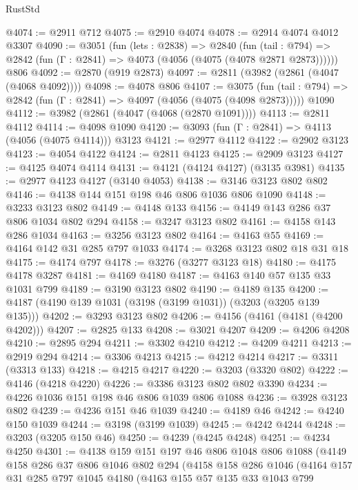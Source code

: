 \begin{lexlean}{RustStd}
\begin{coremodule}
@4074 := @2911 @712
@4075 := @2910 @4074
@4078 := @2914 @4074 @4012 @3307
@4090 := @3051
    (fun (lets : @2838) =>
    @2840
      (fun (tail : @794) => @2842 (fun (Γ : @2841) => @4073 (@4056 (@4075 (@4078 @2871 @2873))))))
    @806
@4092 := @2870 (@919 @2873)
@4097 := @2811 (@3982 (@2861 (@4047 (@4068 @4092))))
@4098 := @4078 @806
@4107 := @3075
    (fun (tail : @794) => @2842 (fun (Γ : @2841) => @4097 (@4056 (@4075 (@4098 @2873)))))
    @1090
@4112 := @3982 (@2861 (@4047 (@4068 (@2870 @1091))))
@4113 := @2811 @4112
@4114 := @4098 @1090
@4120 := @3093 (fun (Γ : @2841) => @4113 (@4056 (@4075 @4114))) @3123
@4121 := @2977 @4112
@4122 := @2902 @3123
@4123 := @4054 @4122
@4124 := @2811 @4123
@4125 := @2909 @3123
@4127 := @4125 @4074 @4114
@4131 := @4121 (@4124 @4127) (@3135 @3981)
@4135 := @2977 @4123 @4127 (@3140 @4053)
@4138 := @3146 @3123 @802 @802
@4146 := @4138 @144 @151 @198 @46 @806 @1036 @806 @1090
@4148 := @3233 @3123 @802
@4149 := @4148 @133
@4156 := @4149 @143 @286 @37 @806 @1034 @802 @294
@4158 := @3247 @3123 @802
@4161 := @4158 @143 @286 @1034
@4163 := @3256 @3123 @802
@4164 := @4163 @55
@4169 := @4164 @142 @31 @285 @797 @1033
@4174 := @3268 @3123 @802 @18 @31 @18
@4175 := @4174 @797
@4178 := @3276 (@3277 @3123 @18)
@4180 := @4175 @4178 @3287
@4181 := @4169 @4180
@4187 := @4163 @140 @57 @135 @33 @1031 @799
@4189 := @3190 @3123 @802
@4190 := @4189 @135
@4200 := @4187 (@4190 @139 @1031 (@3198 (@3199 @1031)) (@3203 (@3205 @139 @135)))
@4202 := @3293 @3123 @802
@4206 := @4156 (@4161 (@4181 (@4200 @4202)))
@4207 := @2825 @133
@4208 := @3021 @4207
@4209 := @4206 @4208
@4210 := @2895 @294
@4211 := @3302 @4210
@4212 := @4209 @4211
@4213 := @2919 @294
@4214 := @3306 @4213
@4215 := @4212 @4214
@4217 := @3311 (@3313 @133)
@4218 := @4215 @4217
@4220 := @3203 (@3320 @802)
@4222 := @4146 (@4218 @4220)
@4226 := @3386 @3123 @802 @802 @3390
@4234 := @4226 @1036 @151 @198 @46 @806 @1039 @806 @1088
@4236 := @3928 @3123 @802
@4239 := @4236 @151 @46 @1039
@4240 := @4189 @46
@4242 := @4240 @150 @1039
@4244 := @3198 (@3199 @1039)
@4245 := @4242 @4244
@4248 := @3203 (@3205 @150 @46)
@4250 := @4239 (@4245 @4248)
@4251 := @4234 @4250
@4301 := @4138
    @159
    @151
    @197
    @46
    @806
    @1048
    @806
    @1088
    (@4149
      @158
      @286
      @37
      @806
      @1046
      @802
      @294
      (@4158
        @158
        @286
        @1046
        (@4164
          @157
          @31
          @285
          @797
          @1045
          @4180
          (@4163
            @155
            @57
            @135
            @33
            @1043
            @799

\end{coremodule}
\end{lexlean}
